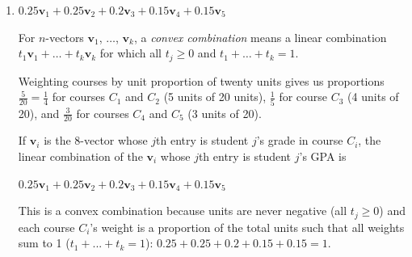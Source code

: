 \begin{solution}
\begin{enumerate}
  \item \begin{answer}
  $0.25\mathbf{v}_1 + 0.25\mathbf{v}_2 + 0.2\mathbf{v}_3 + 0.15\mathbf{v}_4 + 0.15\mathbf{v}_5$  
		\end{answer}
	For $n$-vectors $\mathbf{v}_1$, $\hdots$, $\mathbf{v}_k$, a \emph{convex combination} means a linear combination $t_1\mathbf{v}_1 + \hdots + t_k\mathbf{v}_k$ for which all $t_j \ge 0$ and $t_1 + \hdots + t_k = 1$.
	
	Weighting courses by unit proportion of twenty units gives us proportions $\frac{5}{20} = \frac{1}{4}$ for courses $C_1$ and $C_2$ (5 units of 20 units), $\frac{1}{5}$ for course $C_3$ (4 units of 20), and $\frac{3}{20}$ for courses $C_4$ and $C_5$ (3 units of 20).
	
	If $\mathbf{v}_i$ is the 8-vector whose $j$th entry is student $j$'s grade in course $C_i$, the linear combination of the $\mathbf{v}_i$ whose $j$th entry is student $j$'s GPA is
	
	$0.25\mathbf{v}_1 + 0.25\mathbf{v}_2 + 0.2\mathbf{v}_3 + 0.15\mathbf{v}_4 + 0.15\mathbf{v}_5$  
	
	This is a convex combination because units are never negative (all $t_j \ge 0$) and each course $C_i$'s weight is a proportion of the total units such that all weights sum to 1 ($t_1 + ... + t_k = 1$): $0.25 + 0.25 + 0.2 + 0.15 + 0.15 = 1$.
	

\end{enumerate}
\end{solution}
